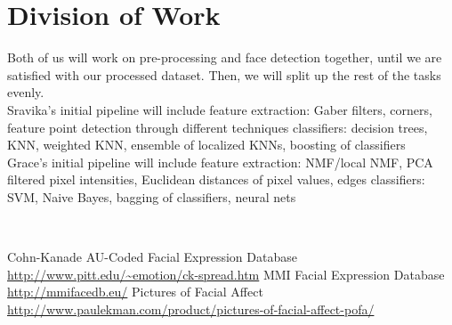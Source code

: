 \documentclass[10pt,letterpaper]{article}
\begin{document}
\section{Division of Work}
Both of us will work on pre-processing and face detection together, until we are satisfied with our processed dataset. Then, we will split up the rest of the tasks evenly.\\

\noindent Sravika's initial pipeline will include
\subitem feature extraction: Gaber filters, corners, feature point detection through different techniques
\subitem classifiers: decision trees, KNN, weighted KNN, ensemble of localized KNNs, boosting of classifiers \\

\noindent Grace's initial pipeline will include
\subitem feature extraction: NMF/local NMF, PCA filtered pixel intensities, Euclidean distances of pixel values, edges
\subitem classifiers: SVM, Naive Bayes, bagging of classifiers, neural nets

\
\begin{thebibliography}{1}
 Cohn-Kanade AU-Coded Facial Expression Database \url{http://www.pitt.edu/~emotion/ck-spread.htm}
\bibitem{mmi} MMI Facial Expression Database \url{http://mmifacedb.eu/}
\bibitem{ekman} Pictures of Facial Affect \url{http://www.paulekman.com/product/pictures-of-facial-affect-pofa/}
\end{thebibliography}
\end{document}

